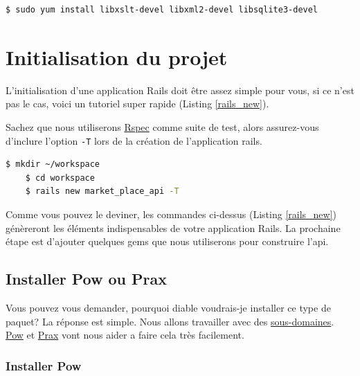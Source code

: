 \documentclass[]{report}
\begin{document}
        \begin{scriptsize}
        \begin{lstlisting}[language=bash]
        $ sudo yum install libxslt-devel libxml2-devel libsqlite3-devel
        \end{lstlisting}
        \end{scriptsize}

  \section{Initialisation du projet}

    L'initialisation d'une application Rails doit être assez simple pour vous, si ce n'est pas le cas, voici un tutoriel super rapide (Listing \ref{rails_new}).

    Sachez que nous utiliserons \href{http://rspec.info/}{Rspec} comme suite de test, alors assurez-vous d'inclure l'option \verb|-T| lors de la création de l'application rails.

    \begin{scriptsize}
    \begin{lstlisting}[language=bash, caption={Initialisation du projet avec 'rails new'.}, label={rails_new}]
    $ mkdir ~/workspace
    $ cd workspace
    $ rails new market_place_api -T
    \end{lstlisting}
    \end{scriptsize}

    Comme vous pouvez le deviner, les commandes ci-dessus (Listing \ref{rails_new}) génèreront les éléments indispensables de votre application Rails. La prochaine étape est d'ajouter quelques gems que nous utiliserons pour construire l'api.

    \subsection{Installer Pow ou Prax}\label{subsection:install_pow}

      Vous pouvez vous demander, pourquoi diable voudrais-je installer ce type de paquet? La réponse est simple. Nous allons travailler avec des \href{http://en.wikipedia.org/wiki/Subdomain}{sous-domaines}. \href{http://pow.cx/}{Pow} et \href{https://github.com/ysbaddaden/prax.cr}{Prax} vont nous aider a faire cela très facilement.

      \subsubsection{Installer Pow}
\end{document}
